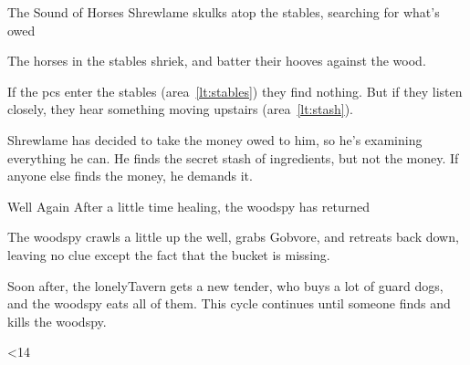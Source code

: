 \documentclass[10pt,twoside]{book}
\begin{document}
{The Sound of Horses}%
{Shrewlame skulks atop the stables, searching for what's owed}%

\begin{boxtext}
  The horses in the stables shriek, and batter their hooves against the wood.
\end{boxtext}

If the \glspl{pc} enter the stables (\gls{area}~\vref{lt:stables}) they find nothing.
But if they listen closely, they hear something moving upstairs (\gls{area}~\vref{lt:stash}).

Shrewlame has decided to take the money owed to him, so he's examining everything he can.
He finds the secret stash of \glspl{ingredient}, but not the money.
If anyone else finds the money, he demands it.

\ifgotspace
  {Well Again}%
  {After a little time healing, the \gls{woodspy} has returned}%

  The \gls{woodspy} crawls a little up the well, grabs Gobvore, and retreats back down, leaving no clue except the fact that the bucket is missing.

  Soon after, the \gls{lonelyTavern} gets a new \gls{tender}, who buys a lot of guard dogs, and the \gls{woodspy} eats all of them.
  This cycle continues until someone finds and kills the \gls{woodspy}.

\fi

\ifnum\thepage<14
  \null\pagebreak\null
\fi
\end{document}
